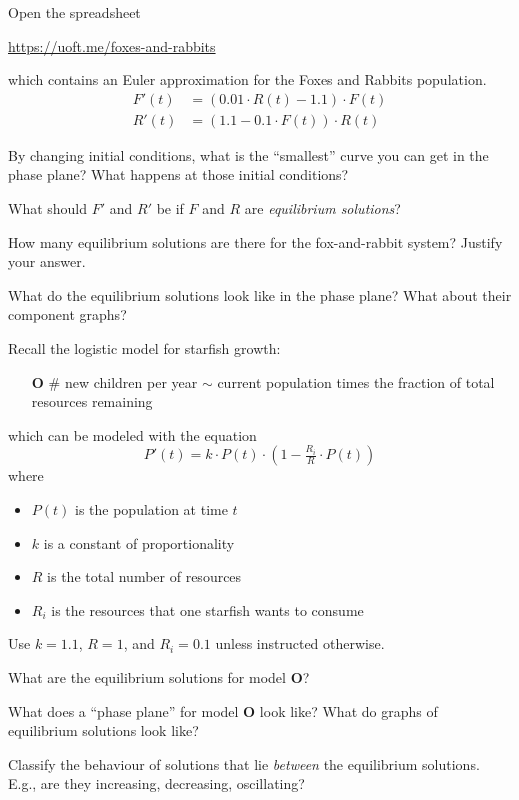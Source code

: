 \documentclass{workbook}
\begin{document}
\begin{slide}
	\question
	Open the spreadsheet

	\url{https://uoft.me/foxes-and-rabbits}

	which contains an Euler approximation for the Foxes and Rabbits population.
	\begin{align*}
		F'(t) &= (0.01\cdot R(t) - 1.1)\cdot F(t)\\
		R'(t) &= (1.1 - 0.1\cdot F(t))\cdot R(t)
	\end{align*}


	\begin{parts}
		\item By changing initial conditions, what is the ``smallest'' curve you can get in the phase plane? What happens at
		those initial conditions?
		\item What should $F'$ and $R'$ be if $F$ and $R$ are \emph{equilibrium solutions}?
		\item How many equilibrium solutions are there for the fox-and-rabbit system? Justify your answer.
		\item What do the equilibrium solutions look like in the phase plane? What about their component graphs?
	\end{parts}
\end{slide}

\begin{slide}
	\question
	Recall the logistic model for starfish growth:
	\begin{itemize}
		\item[\textbf{O}] \# new children per year $\sim$ current population times the fraction of total resources remaining
	\end{itemize}
	which can be modeled with the equation
	\[
		P'(t) = k\cdot P(t)\cdot \left(1-\tfrac{R_i}{R}\cdot P(t)\right)
	\]
	where 
	\begin{itemize}
		\item $P(t)$ is the population at time $t$
		\item $k$ is a constant of proportionality 
		\item $R$ is the total number of resources
		\item $R_i$ is the resources that one starfish wants to consume
	\end{itemize}

	Use $k=1.1$, $R=1$, and $R_i=0.1$ unless instructed otherwise.

	\begin{parts}
		\item What are the equilibrium solutions for model \textbf{O}?
		\item What does a ``phase plane'' for model \textbf{O} look like? What do graphs of equilibrium solutions look like?
		\item Classify the behaviour of solutions that lie \emph{between} the equilibrium solutions. E.g., are they increasing, decreasing, oscillating?
	\end{parts}
\end{slide}
\end{document}
